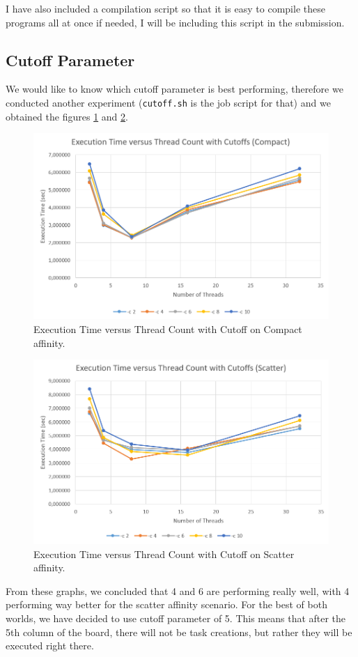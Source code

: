 \documentclass[11pt,reqno]{amsart}
\newcommand{\code}[1]{\texttt{#1}}
\begin{document}
I have also included a compilation script so that it is easy to compile these programs all at once if needed, I will be including this script in the submission.
\subsection{Cutoff Parameter}

We would like to know which cutoff parameter is best performing, therefore we conducted another experiment (\code{cutoff.sh} is the job script for that) and we obtained the figures \ref{fig:cutoff_exp_c} and \ref{fig:cutoff_exp_s}.

\begin{figure}[h]
\centering
\includegraphics[width=0.75\linewidth]{cutoff_compare_compact.png}
\caption{Execution Time versus Thread Count with Cutoff on Compact affinity.}
\label{fig:cutoff_exp_c}
\end{figure}

\begin{figure}[h]
\centering
\includegraphics[width=0.75\linewidth]{cutoff_compare_scatter.png}
\caption{Execution Time versus Thread Count with Cutoff on Scatter affinity.}
\label{fig:cutoff_exp_s}
\end{figure}

From these graphs, we concluded that 4 and 6 are performing really well, with 4 performing way better for the scatter affinity scenario. For the best of both worlds, we have decided to use cutoff parameter of 5. This means that after the 5th column of the board, there will not be task creations, but rather they will be executed right there.
\end{document}
